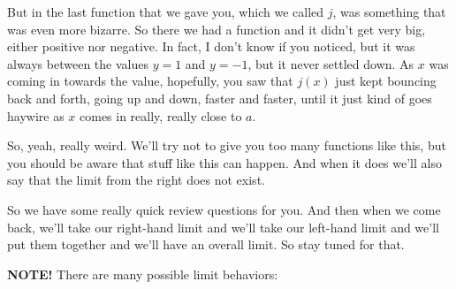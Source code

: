 \documentclass[pdftex, brazil, 12pt, twoside]{article}
\begin{document}
But in the last function that we gave you, which we called $j$,
was something that was even more bizarre.
So there we had a function and it didn't get very big,
either positive nor negative.
In fact, I don't know if you noticed,
but it was always between the values $y = 1$
and $y = -1$, but it never settled down.
As $x$ was coming in towards the value,
hopefully, you saw that $j(x)$ just
kept bouncing back and forth, going up and down, faster
and faster, until it just kind of goes haywire as $x$ comes in
really, really close to $a$.

\begin{figure}[H]
  \begin{center}
  \end{center}
\end{figure}

So, yeah, really weird.
We'll try not to give you too many functions like this,
but you should be aware that stuff like this can happen.
And when it does we'll also say that the limit from the right
does not exist.

So we have some really quick review questions for you.
And then when we come back, we'll take our right-hand limit
and we'll take our left-hand limit
and we'll put them together and we'll have an overall limit.
So stay tuned for that.

\textbf{NOTE!} There are many possible limit behaviors:
\end{document}
